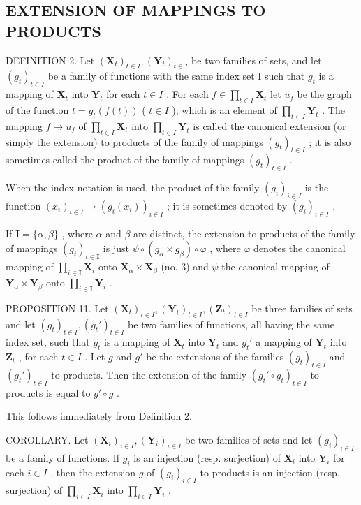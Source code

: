 \subsection{EXTENSION OF MAPPINGS TO PRODUCTS}

DEFINITION 2. Let \((\mathbf{X}_t)_{t \in I}, (\mathbf{Y}_t)_{t \in I}\) be two families of sets, and let \((g_t)_{t \in I}\) be a family of functions with the same index set I such that \(g_t\) is a mapping of \(\mathbf{X}_t\) into \(\mathbf{Y}_t\) for each \(t \in I\) . For each \(f \in \prod_{t \in I} \mathbf{X}_t\) let \(u_f\) be the graph of the function \(t = g_t(f(t))\) ( \(t \in I\) ), which is an element of \(\prod_{t \in I} \mathbf{Y}_t\) . The mapping \(f \to u_f\) of \(\prod_{t \in I} \mathbf{X}_t\) into \(\prod_{t \in I} \mathbf{Y}_t\) is called the canonical extension (or simply the extension) to products of the family of mappings \((g_t)_{t \in I}\) ; it is also sometimes called the product of the family of mappings \((g_t)_{t \in I}\) .

When the index notation is used, the product of the family \((g_{i})_{i\in I}\) is the function \((x_{i})_{i\in I}\to (g_{i}(x_{i}))_{i\in I}\) ; it is sometimes denoted by \((g_{i})_{i\in I}\) .

If \(\mathbf{I} = \{\alpha, \beta\}\) , where \(\alpha\) and \(\beta\) are distinct, the extension to products of the family of mappings \((g_t)_{t \in \mathbf{I}}\) is just \(\psi \circ (g_\alpha \times g_\beta) \circ \varphi\) , where \(\varphi\) denotes the canonical mapping of \(\prod_{i \in \mathbf{I}} \mathbf{X}_i\) onto \(\mathbf{X}_\alpha \times \mathbf{X}_\beta\) (no. 3) and \(\psi\) the canonical mapping of \(\mathbf{Y}_\alpha \times \mathbf{Y}_\beta\) onto \(\prod_{i \in \mathbf{I}} \mathbf{Y}_i\) .

PROPOSITION 11. Let \((\mathbf{X}_t)_{t \in I}, (\mathbf{Y}_t)_{t \in I}, (\mathbf{Z}_t)_{t \in I}\) be three families of sets and let \((g_t)_{t \in I}, (g_t')_{t \in I}\) be two families of functions, all having the same index set, such that \(g_t\) is a mapping of \(\mathbf{X}_t\) into \(\mathbf{Y}_t\) and \(g_t'\) a mapping of \(\mathbf{Y}_t\) into \(\mathbf{Z}_t\) , for each \(t \in I\) . Let \(g\) and \(g'\) be the extensions of the families \((g_t)_{t \in I}\) and \((g_t')_{t \in I}\) to products. Then the extension of the family \((g_t' \circ g_t)_{t \in I}\) to products is equal to \(g'\circ g\) .

This follows immediately from Definition 2.

COROLLARY. Let \((\mathbf{X}_i)_{i\in I}, (\mathbf{Y}_i)_{i\in I}\) be two families of sets and let \((g_i)_{i\in I}\) be a family of functions. If \(g_i\) is an injection (resp. surjection) of \(\mathbf{X}_i\) into \(\mathbf{Y}_i\) for each \(i\in I\) , then the extension \(g\) of \((g_i)_{i\in I}\) to products is an injection (resp. surjection) of \(\prod_{i\in I} \mathbf{X}_i\) into \(\prod_{i\in I} \mathbf{Y}_i\) .


